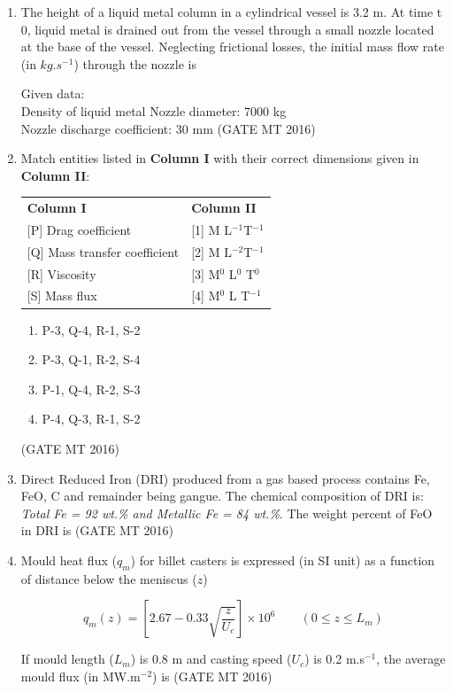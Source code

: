 \documentclass[journal, 11pt, onecolumn]{IEEEtran}
\theoremstyle{remark}
\begin{document}
\begin{enumerate}
\item The height of a liquid metal column in a cylindrical vessel is 3.2 m. At time t 0, liquid metal is drained out from the vessel through a small nozzle located at the base of the vessel. Neglecting frictional losses, the initial mass flow rate (in $kg.s^{-1}$) through the nozzle is 


    Given data:\\
    Density of liquid metal Nozzle diameter: 7000 kg \\
    Nozzle discharge coefficient: 30 mm
\hfill(GATE MT 2016)

\item Match entities listed in \textbf{Column I} with their correct dimensions given in \textbf{Column II}:

\begin{tabular}{ll}
\textbf{Column I} & \textbf{Column II} \\
{[P]} Drag coefficient & {[1]} M L$^{-1}$T$^{-1}$ \\
{[Q]} Mass transfer coefficient & {[2]} M L$^{-2}$T$^{-1}$ \\
{[R]} Viscosity & {[3]} M$^0$ L$^0$ T$^0$ \\
{[S]} Mass flux & {[4]} M$^0$ L T$^{-1}$ \\
\end{tabular}

\begin{enumerate}
\item P-3, Q-4, R-1, S-2
\item P-3, Q-1, R-2, S-4
\item P-1, Q-4, R-2, S-3
\item P-4, Q-3, R-1, S-2
\end{enumerate}
\hfill(GATE MT 2016)

\item Direct Reduced Iron (DRI) produced from a gas based process contains Fe, FeO, C and remainder being gangue. The chemical composition of DRI is: \textit{Total Fe = 92 wt.\% and Metallic Fe = 84 wt.\%}. The weight percent of FeO in DRI is 
\hfill(GATE MT 2016)

\item Mould heat flux ($q_m$) for billet casters is expressed (in SI unit) as a function of distance below the meniscus ($z$)

$$q_m(z) = \left[ 2.67 - 0.33 \sqrt{\frac{z}{U_c}} \right] \times 10^6 \qquad (0 \leq z \leq L_m)$$

If mould length ($L_m$) is 0.8 m and casting speed ($U_c$) is 0.2 m.s$^{-1}$, the average mould flux (in MW.m$^{-2}$) is 
\hfill(GATE MT 2016)


\end{enumerate}
\end{document}
